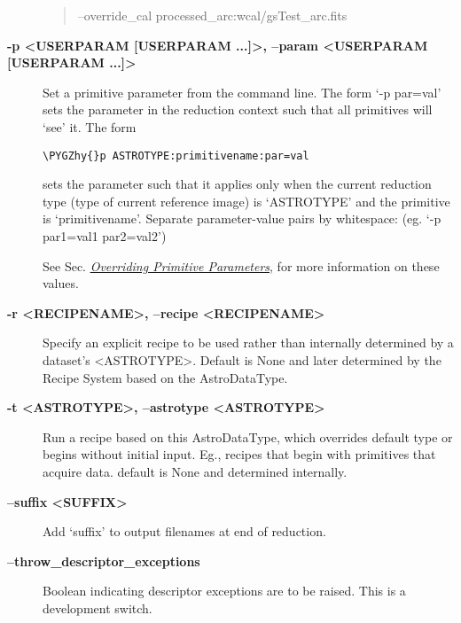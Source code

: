 \documentclass[letterpaper,10pt,english]{sphinxmanual}
\def\PYGZhy{\char`\-}
\begin{document}
\begin{description}
\begin{quote}
--override\_cal processed\_arc:wcal/gsTest\_arc.fits
\end{quote}

\item[{\textbf{-p \textless{}USERPARAM {[}USERPARAM ...{]}\textgreater{}, --param \textless{}USERPARAM {[}USERPARAM ...{]}\textgreater{}}}] \leavevmode
Set a primitive parameter from the command line. The form `-p par=val' sets
the parameter in the reduction context such that all primitives will `see' it.
The form

\begin{Verbatim}[commandchars=\\\{\}]
\PYGZhy{}p ASTROTYPE:primitivename:par=val
\end{Verbatim}

sets the parameter such that it applies only when the current reduction type
(type of current reference image) is `ASTROTYPE' and the primitive is
`primitivename'. Separate parameter-value pairs by whitespace:
(eg. `-p par1=val1 par2=val2')

See Sec. {\hyperref[interfaces:userpars]{\emph{Overriding Primitive Parameters}}}, for more information on these values.

\item[{\textbf{-r \textless{}RECIPENAME\textgreater{}, --recipe \textless{}RECIPENAME\textgreater{}}}] \leavevmode
Specify an explicit recipe to be used rather than internally determined by
a dataset's \textless{}ASTROTYPE\textgreater{}. Default is None and later determined by the Recipe
System based on the AstroDataType.

\item[{\textbf{-t \textless{}ASTROTYPE\textgreater{}, --astrotype \textless{}ASTROTYPE\textgreater{}}}] \leavevmode
Run a recipe based on this AstroDataType, which overrides default type or
begins without initial input. Eg., recipes that begin with primitives that
acquire data.  default is None and determined internally.

\item[{\textbf{--suffix \textless{}SUFFIX\textgreater{}}}] \leavevmode
Add `suffix' to output filenames at end of reduction.

\item[{\textbf{--throw\_descriptor\_exceptions}}] \leavevmode
Boolean indicating descriptor exceptions are to be raised. This is a
development switch.

\end{description}
\end{document}
